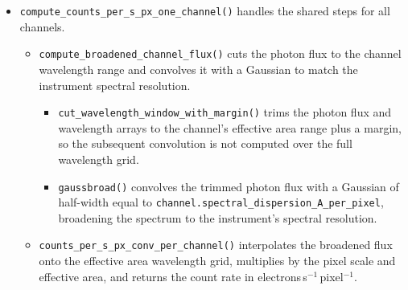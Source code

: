 \begin{itemize}
    \item \texttt{compute\_counts\_per\_s\_px\_one\_channel()} handles the shared steps for all channels.
          \begin{itemize}
              \item \texttt{compute\_broadened\_channel\_flux()} cuts the photon flux to the channel wavelength range and convolves it with a Gaussian to match the instrument spectral resolution.
                    \begin{itemize}
                        \item \texttt{cut\_wavelength\_window\_with\_margin()} trims the photon flux and wavelength arrays to the channel's effective area range plus a margin, so the subsequent convolution is not computed over the full wavelength grid.
                        \item \texttt{gaussbroad()} convolves the trimmed photon flux with a Gaussian of half-width equal to \texttt{channel.spectral\_dispersion\_A\_per\_pixel}, broadening the spectrum to the instrument's spectral resolution.
                    \end{itemize}
              \item \texttt{counts\_per\_s\_px\_conv\_per\_channel()} interpolates the broadened flux onto the effective area wavelength grid, multiplies by the pixel scale and effective area, and returns the count rate in electrons\,s$^{-1}$\,pixel$^{-1}$.


\end{itemize}
\end{itemize}
